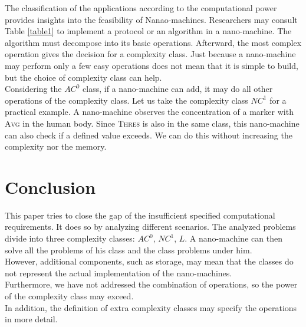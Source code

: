 \documentclass[10pt,sigconf]{acmart}
\begin{document}
The classification of the applications according to the computational power provides insights into the feasibility of Nanao-machines.
Researchers may consult Table \ref{table1} to implement a protocol or an algorithm in a nano-machine. 
The algorithm must decompose into its basic operations. Afterward, the most complex operation gives the decision for a complexity class.
Just because a nano-machine may perform only a few easy operations does not mean that it is simple to build, but the choice of complexity class can help.\\
Considering the $AC^0$ class, if a nano-machine can add, it may do all other operations of the complexity class.
Let us take the complexity class $NC^1$ for a practical example. A nano-machine observes the concentration of a marker with \textsc{Avg} in the human body.
Since \textsc{Thres} is also in the same class, this nano-machine can also check if a defined value exceeds. We can do this without increasing the complexity nor the memory.

\section{Conclusion}
This paper tries to close the gap of the insufficient specified computational requirements.
It does so by analyzing different scenarios. 
The analyzed problems divide into three complexity classes: $AC^0$, $NC^1$, $L$.
A nano-machine can then solve all the problems of his class and the class problems under him.\\
However, additional components, such as storage, may mean that the classes do not represent the actual implementation of the nano-machines.\\
Furthermore, we have not addressed the combination of operations, so the power of the complexity class may exceed.\\
In addition, the definition of extra complexity classes may specify the operations in more detail.








 
\end{document}
